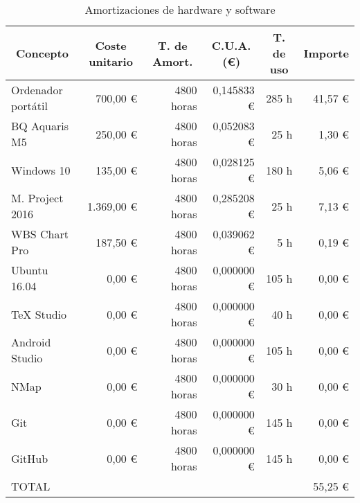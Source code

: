 \begin{table}[H]
	\centering
	\begin{tabular}{ |l|r|r|r|r|r| } 
		\hline
		\multicolumn{1}{|c|}{Concepto} & 
			\multicolumn{1}{|c|}{Coste unitario} & 
				\multicolumn{1}{|c|}{T. de Amort.\tablefootnote{Tiempo de amortización}} & 
					\multicolumn{1}{|c|}{C.U.A.\tablefootnote{Coste unitario de amortización} (\euro)} & 
						\multicolumn{1}{|c|}{T. de uso} & 
							\multicolumn{1}{|c|}{Importe} \\
		\hline
		Ordenador portátil 		& 700,00 \euro 	& 4800 horas & 0,145833 \euro & 285 h	& 41,57 \euro	\\
		BQ Aquaris M5 			& 250,00 \euro 	& 4800 horas & 0,052083 \euro & 25 h	& 1,30 \euro	\\
		Windows 10 				& 135,00 \euro 	& 4800 horas & 0,028125 \euro & 180 h	& 5,06 \euro	\\
		M. Project 2016 	& 1.369,00 \euro & 4800 horas & 0,285208 \euro & 25 h	& 7,13 \euro 	\\
		WBS Chart Pro 			& 187,50 \euro 	& 4800 horas & 0,039062 \euro & 5 h		& 0,19 \euro	\\
		Ubuntu 16.04 			& 0,00 \euro 	& 4800 horas & 0,000000 \euro & 105 h	& 0,00 \euro	\\
		TeX Studio 				& 0,00 \euro 	& 4800 horas & 0,000000 \euro & 40 h	& 0,00 \euro	\\
		Android Studio 			& 0,00 \euro 	& 4800 horas & 0,000000 \euro & 105 h	& 0,00 \euro	\\
		NMap 					& 0,00 \euro 	& 4800 horas & 0,000000 \euro & 30 h	& 0,00 \euro	\\
		Git 					& 0,00 \euro 	& 4800 horas & 0,000000 \euro & 145 h	& 0,00 \euro	\\
		GitHub 					& 0,00 \euro 	& 4800 horas & 0,000000 \euro & 145 h	& 0,00 \euro	\\
		\hline
		\multicolumn{5}{|l}{TOTAL} & \multicolumn{1}{r|}{55,25 \euro} \\ 
		\hline
	\end{tabular}
	\caption{Amortizaciones de hardware y software}
	\label{table:amortizaciones}
\end{table}

